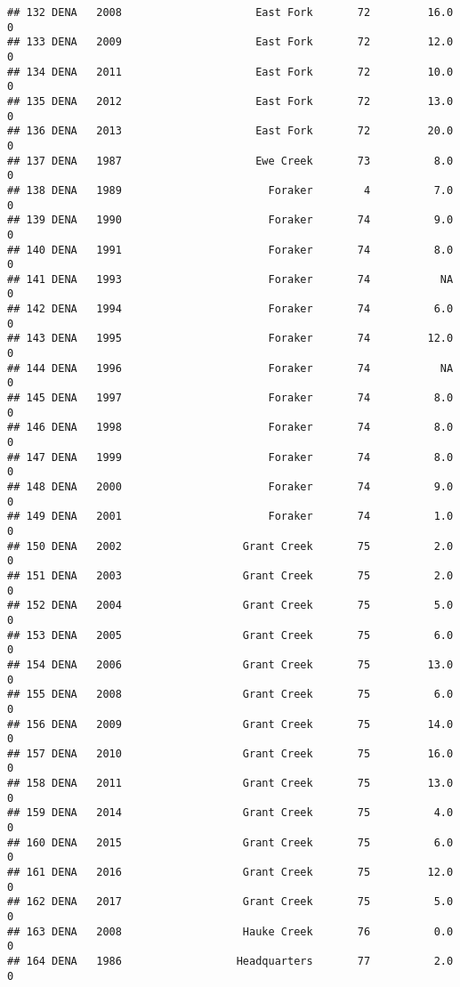 \documentclass[
]{article}
\begin{document}
\begin{verbatim}
## 132 DENA   2008                     East Fork       72         16.0       0
## 133 DENA   2009                     East Fork       72         12.0       0
## 134 DENA   2011                     East Fork       72         10.0       0
## 135 DENA   2012                     East Fork       72         13.0       0
## 136 DENA   2013                     East Fork       72         20.0       0
## 137 DENA   1987                     Ewe Creek       73          8.0       0
## 138 DENA   1989                       Foraker        4          7.0       0
## 139 DENA   1990                       Foraker       74          9.0       0
## 140 DENA   1991                       Foraker       74          8.0       0
## 141 DENA   1993                       Foraker       74           NA       0
## 142 DENA   1994                       Foraker       74          6.0       0
## 143 DENA   1995                       Foraker       74         12.0       0
## 144 DENA   1996                       Foraker       74           NA       0
## 145 DENA   1997                       Foraker       74          8.0       0
## 146 DENA   1998                       Foraker       74          8.0       0
## 147 DENA   1999                       Foraker       74          8.0       0
## 148 DENA   2000                       Foraker       74          9.0       0
## 149 DENA   2001                       Foraker       74          1.0       0
## 150 DENA   2002                   Grant Creek       75          2.0       0
## 151 DENA   2003                   Grant Creek       75          2.0       0
## 152 DENA   2004                   Grant Creek       75          5.0       0
## 153 DENA   2005                   Grant Creek       75          6.0       0
## 154 DENA   2006                   Grant Creek       75         13.0       0
## 155 DENA   2008                   Grant Creek       75          6.0       0
## 156 DENA   2009                   Grant Creek       75         14.0       0
## 157 DENA   2010                   Grant Creek       75         16.0       0
## 158 DENA   2011                   Grant Creek       75         13.0       0
## 159 DENA   2014                   Grant Creek       75          4.0       0
## 160 DENA   2015                   Grant Creek       75          6.0       0
## 161 DENA   2016                   Grant Creek       75         12.0       0
## 162 DENA   2017                   Grant Creek       75          5.0       0
## 163 DENA   2008                   Hauke Creek       76          0.0       0
## 164 DENA   1986                  Headquarters       77          2.0       0

\end{verbatim}
\end{document}
